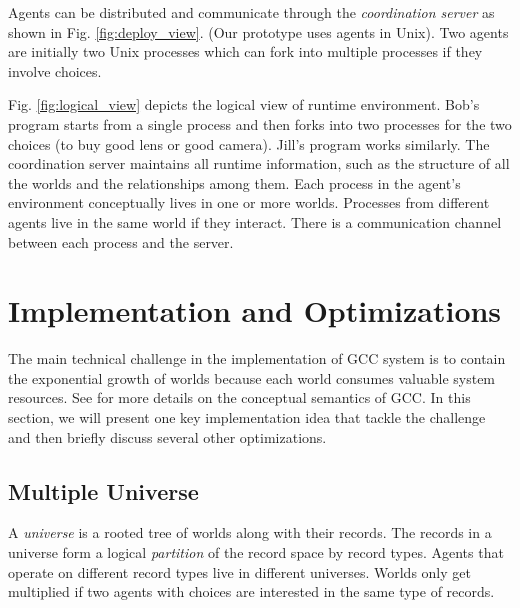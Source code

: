 \documentclass[preprint,10pt]{sigplanconf}
\begin{document}
Agents can be distributed and
communicate through the \emph{coordination server} 
as shown in Fig. \ref{fig:deploy_view}. 
(Our prototype uses agents in Unix).
Two agents are initially two Unix processes which can
fork into multiple processes if they involve choices. 

Fig. \ref{fig:logical_view} depicts the logical view of runtime environment. 
Bob's program starts from a single process and then forks into two processes 
for the two choices (to buy good lens or good camera). 
Jill's program works similarly. 
The coordination server maintains all runtime information, such as 
the structure of all the worlds and the relationships among them. 
Each process in the agent's environment conceptually lives in 
one or more worlds. 
Processes from different agents live in the same world if they interact. 
There is a communication channel between each process and the server. 


\section{Implementation and Optimizations} %

The main technical challenge in the implementation of GCC system is
  to contain the exponential growth of worlds because each world consumes
  valuable system resources. 
See  \cite{JaffarYZ07} for more details on the conceptual semantics of GCC.
In this section, we will present one key 
  implementation idea that tackle the challenge and then briefly discuss several
  other optimizations.

\subsection{Multiple Universe}
A \emph{universe} is a rooted tree of worlds along with their records. 
The records in a universe form a logical \emph{partition} of the 
  record space by record types. 
Agents that operate on different record types live in 
  different universes. Worlds only get multiplied if two agents with
  choices are interested in the same type of records. 

\end{document}

